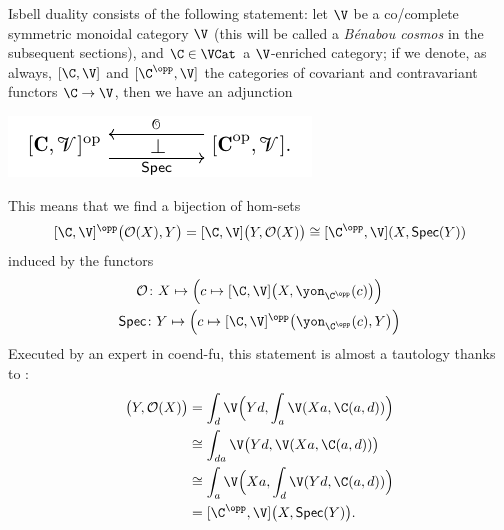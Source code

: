 \begin{example}\label{isbella-duella}
Isbell duality consists of the following statement: let $\V$ be a co/complete symmetric monoidal category $\V$ (this will be called a \emph{Bénabou cosmos} in the subsequent sections), and $\C \in \VCat$ a $\V$-enriched category; if we denote, as always, $[\C, \V]$ and $[\C^\opp,\V]$ the categories of covariant and contravariant functors $\C \to \V$, then we have an adjunction
\begin{center}
\includegraphics[scale=1]{figures/fig4}
\end{center}
This means that we find a bijection of hom-sets
\[
[\C, \V]^\opp\big( \mathcal{O}(X), Y\big) = [\C, \V]\big(Y, \mathcal{O}(X)\big)\cong [\C^\opp, \V](X, \textsf{Spec}(Y))
\]
induced by the functors
\begin{gather*}
\mathcal O \colon X \mapsto \Big( c\mapsto [\C, \V]\big(X, \yon_{\C^\opp}(c)\big)\Big)\\
\textsf{Spec}\colon Y\mapsto \Big( c \mapsto [\C,\V]^\opp\big( \yon_{\C^\opp}(c),Y \big) \Big)
\end{gather*}
Executed by an expert in coend-fu, this statement is almost a tautology thanks to \athm{}:
\begin{align*}
[\C, \V]\big(Y, \mathcal{O}(X)\big) & = \int_d \V\Big(Yd, \int_a \V(Xa, \C(a,d))\Big)\\
&\cong \int_{da}\V\big(Yd,\V(Xa, \C(a,d))\big)\\
&\cong \int_a\V\Big(Xa,\int_d\V(Yd, \C(a,d))\Big)\\
&= [\C^\opp,\V]\big(X, \textsf{Spec}(Y)\big).
\end{align*}
\end{example}
